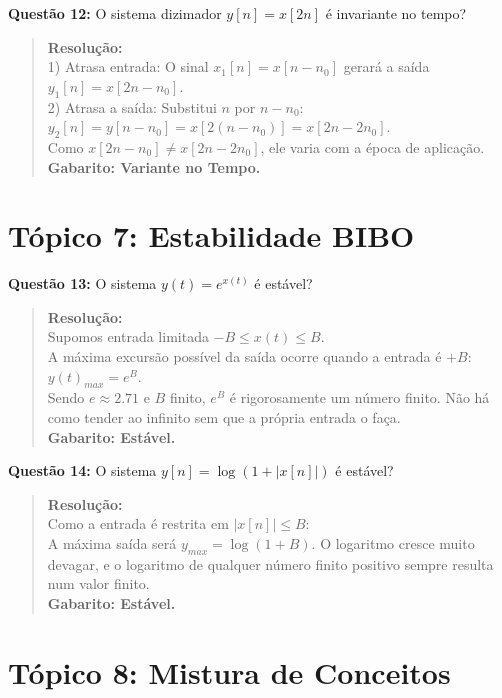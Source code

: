\textbf{Questão 12:} O sistema dizimador \(y[n] = x[2n]\) é invariante no tempo?

\begin{quote}
\textbf{Resolução:}\\
1) Atrasa entrada: O sinal \(x_1[n] = x[n-n_0]\) gerará a saída \(y_1[n] = x[2n - n_0]\).\\
2) Atrasa a saída: Substitui \(n\) por \(n-n_0\): \(y_2[n] = y[n-n_0] = x[2(n-n_0)] = x[2n - 2n_0]\).\\
Como \(x[2n - n_0] \neq x[2n - 2n_0]\), ele varia com a época de aplicação.\\
\textbf{Gabarito: Variante no Tempo.}
\end{quote}

\section{Tópico 7: Estabilidade BIBO}\label{tuxf3pico-7-estabilidade-bibo}

\textbf{Questão 13:} O sistema \(y(t) = e^{x(t)}\) é estável?

\begin{quote}
\textbf{Resolução:}\\
Supomos entrada limitada \(-B \le x(t) \le B\).\\
A máxima excursão possível da saída ocorre quando a entrada é \(+B\):\\
\(y(t)_{max} = e^B\).\\
Sendo \(e \approx 2.71\) e \(B\) finito, \(e^B\) é rigorosamente um número finito. Não há como tender ao infinito sem que a própria entrada o faça.\\
\textbf{Gabarito: Estável.}
\end{quote}

\textbf{Questão 14:} O sistema \(y[n] = \log(1 + |x[n]|)\) é estável?

\begin{quote}
\textbf{Resolução:}\\
Como a entrada é restrita em \(|x[n]| \le B\):\\
A máxima saída será \(y_{max} = \log(1 + B)\). O logaritmo cresce muito devagar, e o logaritmo de qualquer número finito positivo sempre resulta num valor finito.\\
\textbf{Gabarito: Estável.}
\end{quote}

\section{Tópico 8: Mistura de Conceitos}\label{tuxf3pico-8-mistura-de-conceitos}

